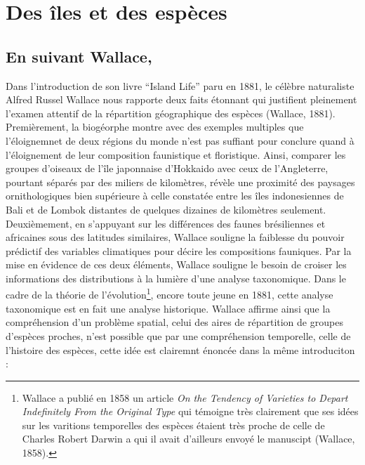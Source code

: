\section*{Des îles et des espèces}\label{des-uxeeles-et-des-espuxe8ces}

\subsection*{En suivant Wallace,}\label{en-suivant-wallace}

Dans l'introduction de son livre ``Island Life'' paru en 1881, le
célèbre naturaliste Alfred Russel Wallace nous rapporte deux faits
étonnant qui justifient pleinement l'examen attentif de la répartition
géographique des espèces (Wallace, 1881). Premièrement, la biogéorphe
montre avec des exemples multiples que l'éloignemnet de deux régions du
monde n'est pas suffiant pour conclure quand à l'éloignement de leur
composition faunistique et floristique. Ainsi, comparer les groupes
d'oiseaux de l'île japonnaise d'Hokkaido avec ceux de l'Angleterre,
pourtant séparés par des miliers de kilomètres, révèle une proximité des
paysages ornithologiques bien supérieure à celle constatée entre les
îles indonesiennes de Bali et de Lombok distantes de quelques dizaines
de kilomètres seulement. Deuxièmement, en s'appuyant sur les différences
des faunes brésiliennes et africaines sous des latitudes similaires,
Wallace souligne la faiblesse du pouvoir prédictif des variables
climatiques pour décire les compositions fauniques. Par la mise en
évidence de ces deux éléments, Wallace souligne le besoin de croiser les
informations des distributions à la lumière d'une analyse taxonomique.
Dans le cadre de la théorie de l'évolution\footnote{Wallace a publié en
  1858 un article \emph{On the Tendency of Varieties to Depart
  Indefinitely From the Original Type} qui témoigne très clairement que
  ses idées sur les varitions temporelles des espèces étaient très
  proche de celle de Charles Robert Darwin a qui il avait d'ailleurs
  envoyé le manuscipt (Wallace, 1858).}, encore toute jeune en 1881,
cette analyse taxonomique est en fait une analyse historique. Wallace
affirme ainsi que la compréhension d'un problème spatial, celui des
aires de répartition de groupes d'espèces proches, n'est possible que
par une compréhension temporelle, celle de l'histoire des espèces, cette
idée est clairemnt énoncée dans la même introduciton :

